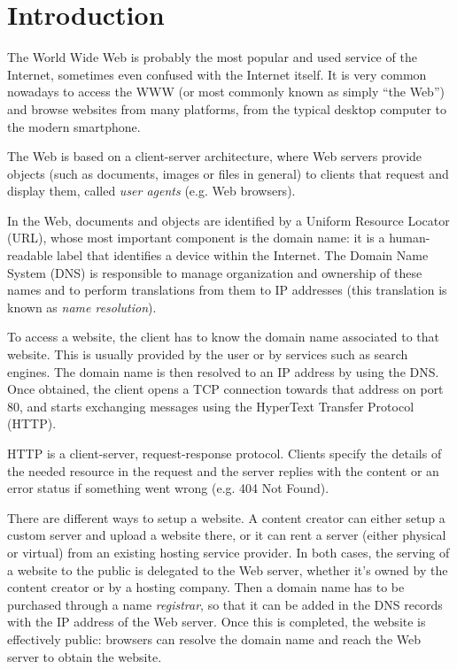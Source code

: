 \documentclass[mscthesis]{usiinfthesis}
\begin{document}
\tableofcontents

\mainmatter

\chapter{Introduction}\label{ch:intro}

The World Wide Web is probably the most popular and used service of the Internet, sometimes even confused with the Internet itself. It is very common nowadays to access the WWW (or most commonly known as simply ``the Web'') and browse websites from many platforms, from the typical desktop computer to the modern smartphone.


The Web is based on a client-server architecture, where Web servers provide objects (such as documents, images or files in general) to clients that request and display them, called \textit{user agents} (e.g. Web browsers).

In the Web, documents and objects are identified by a Uniform Resource Locator (URL), whose most important component is the domain name: it is a human-readable label that identifies a device within the Internet. The Domain Name System (DNS) is responsible to manage organization and ownership of these names and to perform translations from them to IP addresses (this translation is known as \emph{name resolution}).

To access a website, the client has to know the domain name associated to that website. This is usually provided by the user or by services such as search engines. The domain name is then resolved to an IP address by using the DNS. Once obtained, the client opens a TCP connection towards that address on port 80, and starts exchanging messages using the HyperText Transfer Protocol (HTTP).

HTTP is a client-server, request-response protocol. Clients specify the details of the needed resource in the request and the server replies with the content or an error status if something went wrong (e.g. 404 Not Found).

There are different ways to setup a website. A content creator can either setup a custom server and upload a website there, or it can rent a server (either physical or virtual) from an existing hosting service provider. In both cases, the serving of a website to the public is delegated to the Web server, whether it's owned by the content creator or by a hosting company. Then a domain name has to be purchased through a name \emph{registrar}, so that it can be added in the DNS records with the IP address of the Web server. Once this is completed, the website is effectively public: browsers can resolve the domain name and reach the Web server to obtain the website.
\end{document}
